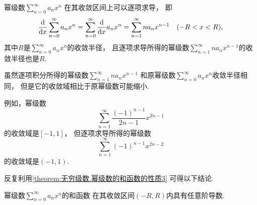 \begin{property}\label{theorem:无穷级数.幂级数的和函数的性质3}
幂级数\(\sum_{n=0}^\infty a_n x^n\)
在其收敛区间上可以逐项求导，
即\begin{equation}
	\dv{x} \sum_{n=0}^\infty a_n x^n
	= \sum_{n=0}^\infty \dv{x} a_n x^n
	= \sum_{n=1}^\infty n a_n x^{n-1}
	\quad(-R<x<R),
\end{equation}
其中\(R\)是\(\sum_{n=0}^\infty a_n x^n\)的收敛半径，
且逐项求导所得的幂级数\(\sum_{n=1}^\infty n a_n x^{n-1}\)的收敛半径也是\(R\).
\end{property}
\begin{remark}
虽然逐项积分所得的幂级数\(\sum_{n=1}^\infty n a_n x^{n-1}\)
和原幂级数\(\sum_{n=0}^\infty a_n x^n\)收敛半径相同，
但是它的收敛域相比于原幂级数可能缩小.

例如，幂级数\begin{equation*}
	\sum_{n=1}^\infty \frac{(-1)^{n-1}}{2n-1} x^{2n-1}
\end{equation*}的收敛域是\([-1,1]\)，
但逐项求导所得的幂级数\begin{equation*}
	\sum_{n=1}^\infty (-1)^{n-1} x^{2n-2}
\end{equation*}的收敛域是\((-1,1)\).
\end{remark}

反复利用\cref{theorem:无穷级数.幂级数的和函数的性质3} 可得以下结论.
\begin{proposition}
幂级数\(\sum_{n=0}^\infty a_n x^n\)的和函数
在其收敛区间\((-R,R)\)内具有任意阶导数.
\end{proposition}

